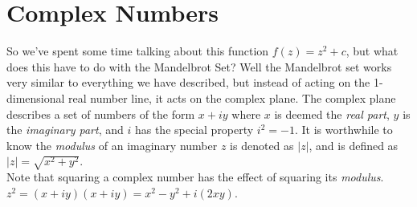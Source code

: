 \documentclass[20pt]{article} %
\begin{document}
\section{Complex Numbers}
So we've spent some time talking about this function $f(z)=z^{2}+c$, but what does this have to do with the Mandelbrot Set? Well the Mandelbrot set works very similar to everything we have described, but instead of acting on the 1-dimensional real number line, it acts on the complex plane.  The complex plane describes a set of numbers of the form $x + iy$ where $x$ is deemed the \textit{real part}, $y$ is the \textit{imaginary part}, and $i$ has the special property $i^{2}=-1$.  It is worthwhile to know the \textit{modulus} of an imaginary number $z$ is denoted as $|z|$, and is defined as $|z|=\sqrt{x^{2}+y^{2}}$. \\

Note that squaring a complex number has the effect of squaring its \textit{modulus}. $z^{2} = (x+iy)(x+iy)=x^{2}-y^{2}+i(2xy)$.
\end{document}
